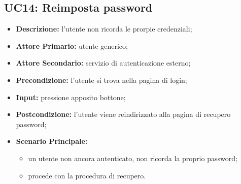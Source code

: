 \subsection{UC14: Reimposta password}
\label{sec:UC14}
\begin{itemize}
    \item \textbf{Descrizione:} l'utente non ricorda le prorpie credenziali;
    \item \textbf{Attore Primario:} utente generico;
    \item \textbf{Attore Secondario:} servizio di autenticazione esterno;
    \item \textbf{Precondizione:} l'utente si trova nella pagina di login;
    \item \textbf{Input:} pressione apposito bottone;
    \item \textbf{Postcondizione:} l'utente viene reindirizzato alla pagina di recupero password;
    \item \textbf{Scenario Principale:}
          \begin{itemize}
              \item un utente non ancora autenticato, non ricorda la proprio password;
              \item procede con la procedura di recupero.
          \end{itemize}
\end{itemize}